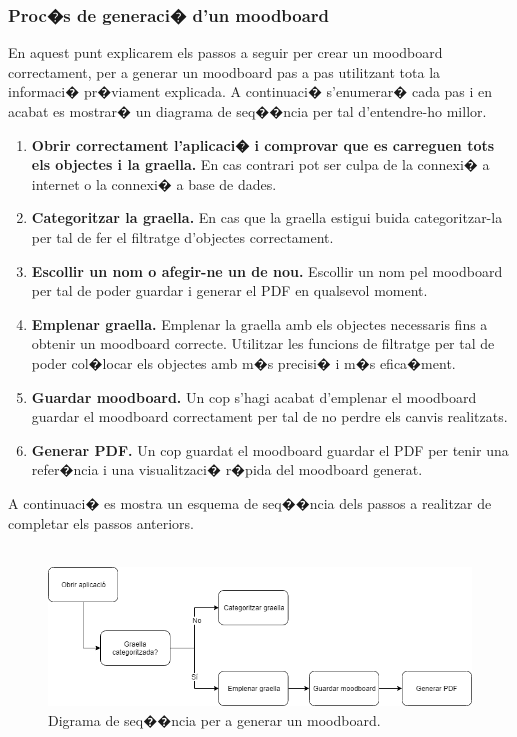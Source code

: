 \documentclass[12pt,a4paper,openright,oneside]{article}
\numberwithin{equation}{section}
\theoremstyle{definition}
\begin{document}
\subsubsection{Proc�s de generaci� d'un moodboard}
En aquest punt explicarem els passos a seguir per crear un moodboard correctament, per a generar un moodboard pas a pas utilitzant tota la informaci� pr�viament explicada. A continuaci� s'enumerar� cada pas i en acabat es mostrar� un diagrama de seq��ncia per tal d'entendre-ho millor.
\begin{enumerate}
\item \textbf{Obrir correctament l'aplicaci� i comprovar que es carreguen tots els objectes i la graella.} En cas contrari pot ser culpa de la connexi� a internet o la connexi� a base de dades.
\item \textbf{Categoritzar la graella.} En cas que la graella estigui buida categoritzar-la per tal de fer el filtratge d'objectes correctament.
\item \textbf{Escollir un nom o afegir-ne un de nou.} Escollir un nom pel moodboard per tal de poder guardar i generar el PDF en qualsevol moment.
\item \textbf{Emplenar graella.} Emplenar la graella amb els objectes necessaris fins a obtenir un moodboard correcte. Utilitzar les funcions de filtratge per tal de poder col�locar els objectes amb m�s precisi� i m�s efica�ment.
\item \textbf{Guardar moodboard.} Un cop s'hagi acabat d'emplenar el moodboard guardar el moodboard correctament per tal de no perdre els canvis realitzats.
\item \textbf{Generar PDF.} Un cop guardat el moodboard guardar el PDF per tenir una refer�ncia i una visualitzaci� r�pida del moodboard generat.
\end{enumerate}
A continuaci� es mostra un esquema de seq��ncia dels passos a realitzar de completar els passos anteriors. \\\\
\begin{figure}[h!]
\begin{center}
\includegraphics[width=\textwidth]{diagram}
\caption{Digrama de seq��ncia per a generar un moodboard.}
\end{center}
\end{figure}
\\\\
\newpage
\end{document}
